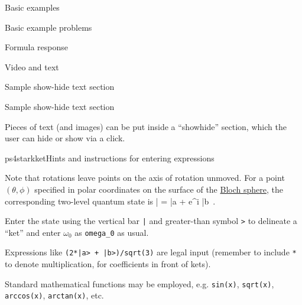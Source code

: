 \begin{edXchapter}{Basic examples}
\begin{edXsection}{Basic example problems}
\begin{edXvertical}
\begin{edXproblem}{Formula response}
\edXinline{$\lambda =$ }
%

\end{edXproblem}

\end{edXvertical}

\end{edXsection}


\begin{edXsection}{Video and text}

\begin{edXvertical}

\begin{edXtext}{Sample show-hide text section}

{\LARGE Sample show-hide text section}

Pieces of text (and images) can be put inside a ``showhide'' section, which the user can hide or show via a click.

\begin{edXshowhide}{ps4starkket}{Hints and instructions for entering expressions}

Note that rotations leave points on the axis of rotation unmoved.  For
a point $(\theta, \phi)$ specified in polar coordinates on the surface
of the \href{http://en.wikipedia.org/wiki/Bloch_sphere}{Bloch sphere},
the corresponding two-level quantum state is
\bea
	|\psi\> = \cos{} |a\> +
        e^{i\phi}\sin{} |b\>
\,.
\eea

Enter the state using the vertical bar \texttt{|} and greater-than
symbol \texttt{>} to delineate a ``ket'' and enter $\omega_0$ as \texttt{omega_0} as usual.

Expressions like \texttt{(2*|a> + |b>)/sqrt(3)} are legal input
(remember to include \texttt{*} to denote multiplication, for
coefficients in front of kets).

Standard mathematical functions may be employed, e.g. \texttt{sin(x)},
\texttt{sqrt(x)}, \texttt{arccos(x)},  \texttt{arctan(x)}, etc.  

\end{edXshowhide}

\end{edXtext}

\end{edXvertical}

\begin{edXvertical}


\end{edXvertical}

\end{edXsection}

\end{edXchapter}
